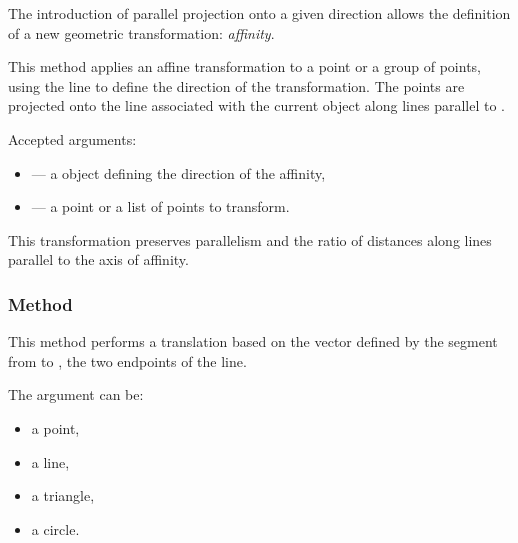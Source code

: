 The introduction of parallel projection onto a given direction allows the definition of a new geometric transformation: \emph{affinity}.

\medskip
\noindent
This method applies an affine transformation to a point or a group of points, using the line  to define the direction of the transformation. The points are projected onto the line associated with the current object along lines parallel to .

\medskip
\noindent
Accepted arguments:
\begin{itemize}
  \item {} — a  object defining the direction of the affinity,
  \item {} — a point or a list of points to transform.
\end{itemize}

\noindent
This transformation preserves parallelism and the ratio of distances along lines parallel to the axis of affinity.

\vspace{1em}

\begin{tkzexample}[latex=.5\textwidth]
\begin{center}
\end{center}

\end{tkzexample}

\subsubsection{Method }
\label{ssub:example_translation}

This method performs a translation based on the vector defined by the segment from  to , the two endpoints of the line.

\medskip
\noindent
The argument  can be:
\begin{itemize}
  \item a point,
  \item a line,
  \item a triangle,
  \item a circle.
\end{itemize}

